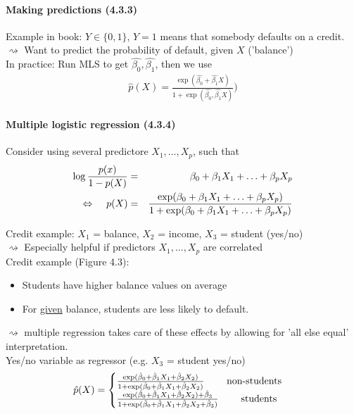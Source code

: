 \documentclass[11pt,a4paper,numbers=endperiod]{scrartcl}
\newcommand{\id}{\hspace*{4mm}}
\begin{document}
{\paragraph{Making predictions (4.3.3)}
$ $\\

Example in book: $Y \in \{0,1\}$, $Y = 1$ means that somebody defaults on a credit.\\
\id \id $\rightsquigarrow$ Want to predict the probability of default, given $X$ ('balance')\\
In practice: Run MLS to get $\hat{\beta_0}, \hat{\beta_1}$, then we use \begin{align*}
	\hat{p}(X) = \frac{\exp(\hat{\beta_0} + \hat{\beta_1} X)}{1 + \exp(\hat{\beta_0}, \hat{\beta_1}X)})
\end{align*}

\paragraph{Multiple logistic regression (4.3.4)}
$ $\\

Consider using several predictore $X_1, \ldots, X_p$, such that \begin{eqnarray*}
	\log \frac{p(x)}{1 - p(X)} &=& \beta_0 + \beta_1 X_1 + \ldots + \beta_p X_p\\
	\Leftrightarrow \id p(X) &=& \frac{\exp(\beta_0 + \beta_1 X_1 + \ldots + \beta_p X_p)}{1 + \exp(\beta_0 + \beta_1 X_1 + \ldots + \beta_p X_p)}\\
\end{eqnarray*}

Credit example: $X_1$ = balance, $X_2$ = income, $X_3$ = student (yes/no)\\
\id $\rightsquigarrow$ Especially helpful if predictors $X_1, \ldots, X_p$ are correlated\\
Credit example (Figure 4.3): \begin{itemize}
	\item Students have higher balance values on average
	\item For \underline{given} balance, students are less likely to default. 
\end{itemize}
$\rightsquigarrow$ multiple regression takes care of these effects by allowing for 'all else equal' interpretation.\\
Yes/no variable as regressor (e.g. $X_3$ = student yes/no) \begin{align*}
	\hat{p}(X) =  \begin{cases}
	\frac{\exp(\hat{\beta}_0 + \hat{\beta}_1X_1 + \hat{\beta}_2X_2)}{ 1+ \exp(\hat{\beta}_0 + \hat{\beta}_1X_1 + \hat{\beta}_2X_2)} \id \id \text{non-students}\\
	\frac{\exp(\hat{\beta}_0 + \hat{\beta}_1X_1 + \hat{\beta}_2X_2) + \hat{\beta}_3}{ 1+ \exp(\hat{\beta}_0 + \hat{\beta}_1X_1 + \hat{\beta}_2X_2 + \hat{\beta}_3)}  \id \id \text{students}
	\end{cases}
\end{align*}

}
\end{document}
